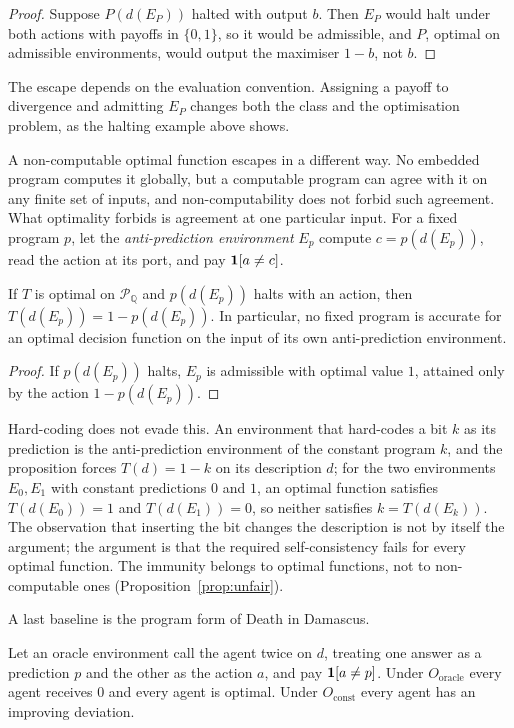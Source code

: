\begin{proof}
Suppose $P(d(E_P))$ halted with output $b$. Then $E_P$ would halt under both actions with payoffs in
$\{0,1\}$, so it would be admissible, and $P$, optimal on admissible environments, would output the
maximiser $1-b$, not $b$.
\end{proof}

The escape depends on the evaluation convention. Assigning a payoff to divergence and admitting
$E_P$ changes both the class and the optimisation problem, as the halting example above shows.

A non-computable optimal function escapes in a different way. No embedded program computes it
globally, but a computable program can agree with it on any finite set of inputs, and
non-computability does not forbid such agreement. What optimality forbids is agreement at one
particular input. For a fixed program $p$, let the \emph{anti-prediction environment} $E_p$ compute
$c=p(d(E_p))$, read the action at its port, and pay $\mathbf{1}[a\ne c]$.

\begin{proposition}\label{prop:antipred}
If $T$ is optimal on $\mathcal P_{\mathbb Q}$ and $p(d(E_p))$ halts with an action, then
$T(d(E_p))=1-p(d(E_p))$. In particular, no fixed program is accurate for an optimal decision function
on the input of its own anti-prediction environment.
\end{proposition}

\begin{proof}
If $p(d(E_p))$ halts, $E_p$ is admissible with optimal value $1$, attained only by the action
$1-p(d(E_p))$.
\end{proof}

Hard-coding does not evade this. An environment that hard-codes a bit $k$ as its prediction is the
anti-prediction environment of the constant program $k$, and the proposition forces $T(d)=1-k$ on its
description $d$; for the two environments $E_0,E_1$ with constant predictions $0$ and $1$, an optimal
function satisfies $T(d(E_0))=1$ and $T(d(E_1))=0$, so neither satisfies $k=T(d(E_k))$. The
observation that inserting the bit changes the description is not by itself the argument; the
argument is that the required self-consistency fails for every optimal function. The immunity
belongs to optimal functions, not to non-computable ones (Proposition~\ref{prop:unfair}).

A last baseline is the program form of Death in Damascus.

\begin{proposition}\label{prop:doublecall}
Let an oracle environment call the agent twice on $d$, treating one answer as a prediction $p$ and the
other as the action $a$, and pay $\mathbf{1}[a\neq p]$. Under $O_{\mathrm{oracle}}$ every agent receives $0$
and every agent is optimal. Under $O_{\mathrm{const}}$ every agent has an improving deviation.
\end{proposition}

